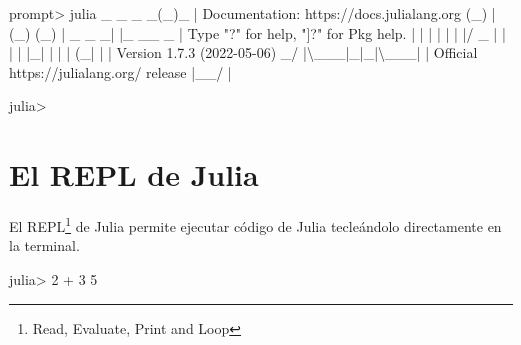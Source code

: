 \documentclass[
  letterpaper,
  DIV=11,
  numbers=noendperiod]{scrreprt}
\newenvironment{Shaded}{\begin{snugshade}}{\end{snugshade}}
\newcommand{\ErrorTok}[1]{\textcolor[rgb]{0.68,0.00,0.00}{#1}}
\newcommand{\ExtensionTok}[1]{\textcolor[rgb]{0.00,0.23,0.31}{#1}}
\newcommand{\KeywordTok}[1]{\textcolor[rgb]{0.00,0.23,0.31}{#1}}
\newcommand{\NormalTok}[1]{\textcolor[rgb]{0.00,0.23,0.31}{#1}}
\newcommand{\OperatorTok}[1]{\textcolor[rgb]{0.37,0.37,0.37}{#1}}
\newcommand{\StringTok}[1]{\textcolor[rgb]{0.13,0.47,0.30}{#1}}
\begin{document}
\begin{Shaded}
\begin{Highlighting}[]
\ExtensionTok{prompt}\OperatorTok{\textgreater{}}\NormalTok{ julia}
               \ExtensionTok{\_}
   \ExtensionTok{\_}\NormalTok{       \_ \_}\ErrorTok{(}\ExtensionTok{\_}\KeywordTok{)}\ExtensionTok{\_}     \KeywordTok{|}  \ExtensionTok{Documentation:}\NormalTok{ https://docs.julialang.org}
  \KeywordTok{(}\ExtensionTok{\_}\KeywordTok{)}     \KeywordTok{|} \KeywordTok{(}\ExtensionTok{\_}\KeywordTok{)} \KeywordTok{(}\ExtensionTok{\_}\KeywordTok{)}    \KeywordTok{|}
   \ExtensionTok{\_}\NormalTok{ \_   \_}\KeywordTok{|} \KeywordTok{|}\ExtensionTok{\_}\NormalTok{  \_\_ \_   }\KeywordTok{|}  \ExtensionTok{Type} \StringTok{"?"}\NormalTok{ for help, }\StringTok{"]?"}\NormalTok{ for Pkg help.}
  \KeywordTok{|} \KeywordTok{|} \KeywordTok{|} \KeywordTok{|} \KeywordTok{|} \KeywordTok{|} \KeywordTok{|}\ExtensionTok{/}\NormalTok{ \_}\KeywordTok{\textasciigrave{}} \KeywordTok{|}  \KeywordTok{|}
  \KeywordTok{|} \KeywordTok{|} \KeywordTok{|}\ExtensionTok{\_}\KeywordTok{|} \KeywordTok{|} \KeywordTok{|} \KeywordTok{|} \KeywordTok{(}\ExtensionTok{\_}\KeywordTok{|} \KeywordTok{|}  \KeywordTok{|}  \ExtensionTok{Version}\NormalTok{ 1.7.3 }\ErrorTok{(}\ExtensionTok{2022{-}05{-}06}\KeywordTok{)}
 \ExtensionTok{\_/} \KeywordTok{|}\ExtensionTok{\textbackslash{}\_\_}\StringTok{\textquotesingle{}\_|\_|\_|\textbackslash{}\_\_\textquotesingle{}}\ExtensionTok{\_}\KeywordTok{|}  \KeywordTok{|}  \ExtensionTok{Official}\NormalTok{ https://julialang.org/ release}
\KeywordTok{|}\ExtensionTok{\_\_/}                   \KeywordTok{|}

\ExtensionTok{julia}\OperatorTok{\textgreater{}} 
\end{Highlighting}
\end{Shaded}

\hypertarget{el-repl-de-julia}{%
\section{El REPL de Julia}\label{el-repl-de-julia}}

El REPL\footnote{Read, Evaluate, Print and Loop} de Julia permite
ejecutar código de Julia tecleándolo directamente en la terminal.

\begin{Shaded}
\begin{Highlighting}[]
\ExtensionTok{julia}\OperatorTok{\textgreater{}}\NormalTok{ 2 + 3}
\ExtensionTok{5}
\end{Highlighting}
\end{Shaded}
\end{document}
